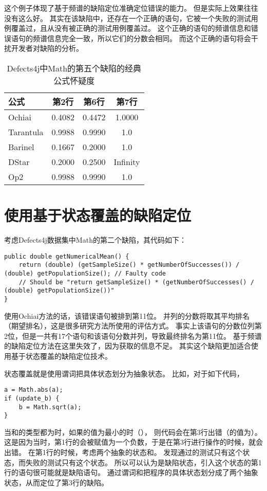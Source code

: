 这个例子体现了基于频谱的缺陷定位准确定位错误的能力。
但是实际上效果往往没有这么好。
其实在该缺陷中，还存在一个正确的语句，它被一个失败的测试用例覆盖过，且从没有被正确的测试用例覆盖过。
这个正确的语句的频谱信息和错误语句的频谱信息完全一致，所以它们的分数会相同。
而这个正确的语句将会干扰开发者对缺陷的分析。

\begin{table}
\centering
\begin{tabular}{|l|c|c|c|}
\hline
公式 & 第2行 & 第6行 & 第7行 \\
\hline
Ochiai & 0.4082 & 0.4472 & 1.0000 \\
\hline
Tarantula & 0.9988 & 0.9990 & 1.0 \\
\hline
Barinel & 0.1667 & 0.2000 & 1.0 \\
\hline
DStar & 0.2000 & 0.2500 & Infinity \\
\hline
Op2 & 0.9988 & 0.9990 & 1.0 \\
\hline
\end{tabular}
\caption{Defects4j中Math的第五个缺陷的经典公式怀疑度}
\label{math_5_susp}
\end{table}

\section{使用基于状态覆盖的缺陷定位}
\label{sec:state_based}

考虑Defects4j数据集中Math的第二个缺陷，其代码如下：
\lstset{language=Java}
\begin{lstlisting}
public double getNumericalMean() {
    return (double) (getSampleSize() * getNumberOfSuccesses()) / (double) getPopulationSize(); // Faulty code
    // Should be "return getSampleSize() * (getNumberOfSuccesses() / (double) getPopulationSize())"
}
\end{lstlisting}

使用Ochiai方法的话，该错误语句被排到第11位。
并列的分数将取其平均排名（期望排名），这是很多研究方法所使用的评估方式\parencite{Pearson2017Evaluating,Xuan2014Learning,Steimann2013Threats,Wong2016A}。
事实上该语句的分数位列第2位，但是一共有17个语句和该语句分数并列，导致最终排名为第11位。
基于频谱的缺陷定位方法在这里失效了，因为获取的信息不足。
其实这个缺陷更加适合使用基于状态覆盖的缺陷定位技术。

状态覆盖就是使用谓词把具体状态划分为抽象状态。
比如，对于如下代码，
\lstset{language=Java}
\begin{lstlisting}
a = Math.abs(a);
if (update_b) {
    b = Math.sqrt(a);
}
\end{lstlisting}
当和的类型都为时，如果的值为最小的时（），
则代码会在第3行出错（的值为）。
这是因为当时，第1行的会被赋值为一个负数，于是在第3行进行操作的时候，就会出错。
在第1行的时候，考虑两个抽象的状态和。
发现通过的测试只有这个状态，而失败的测试只有这个状态。
所以可以认为是缺陷状态，引入这个状态的第1行的语句很可能就是缺陷语句。
通过谓词和把程序的具体状态划分成了两个抽象状态，从而定位了第3行的缺陷。

